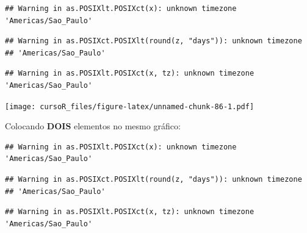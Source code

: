 \documentclass[]{book}
\newenvironment{Shaded}{\begin{snugshade}}{\end{snugshade}}
\newcommand{\KeywordTok}[1]{\textcolor[rgb]{0.13,0.29,0.53}{\textbf{#1}}}
\newcommand{\DataTypeTok}[1]{\textcolor[rgb]{0.13,0.29,0.53}{#1}}
\newcommand{\DecValTok}[1]{\textcolor[rgb]{0.00,0.00,0.81}{#1}}
\newcommand{\StringTok}[1]{\textcolor[rgb]{0.31,0.60,0.02}{#1}}
\newcommand{\CommentTok}[1]{\textcolor[rgb]{0.56,0.35,0.01}{\textit{#1}}}
\newcommand{\OperatorTok}[1]{\textcolor[rgb]{0.81,0.36,0.00}{\textbf{#1}}}
\newcommand{\NormalTok}[1]{#1}
\theoremstyle{definition}
\theoremstyle{definition}
\theoremstyle{definition}
\theoremstyle{remark}
\begin{document}
\begin{verbatim}
## Warning in as.POSIXlt.POSIXct(x): unknown timezone 'Americas/Sao_Paulo'
\end{verbatim}

\begin{verbatim}
## Warning in as.POSIXct.POSIXlt(round(z, "days")): unknown timezone
## 'Americas/Sao_Paulo'
\end{verbatim}

\begin{verbatim}
## Warning in as.POSIXlt.POSIXct(x, tz): unknown timezone 'Americas/Sao_Paulo'
\end{verbatim}

\texttt{[image: cursoR\_files/figure-latex/unnamed-chunk-86-1.pdf]}

Colocando \textbf{DOIS} elementos no mesmo gráfico:

\begin{Shaded}
\end{Shaded}

\begin{verbatim}
## Warning in as.POSIXlt.POSIXct(x): unknown timezone 'Americas/Sao_Paulo'
\end{verbatim}

\begin{verbatim}
## Warning in as.POSIXct.POSIXlt(round(z, "days")): unknown timezone
## 'Americas/Sao_Paulo'
\end{verbatim}

\begin{verbatim}
## Warning in as.POSIXlt.POSIXct(x, tz): unknown timezone 'Americas/Sao_Paulo'
\end{verbatim}
\end{document}
